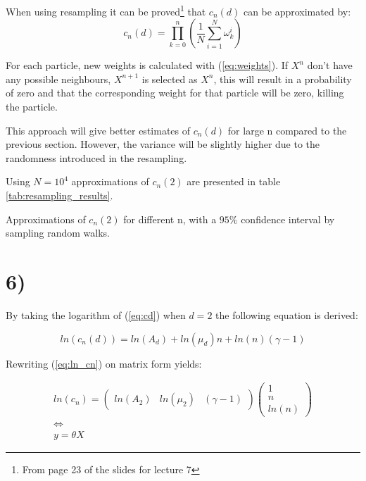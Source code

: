 \documentclass[a4paper]{article}
\begin{document}
When using resampling it can be proved\footnote{From page 23 of the slides for lecture 7} that $c_n(d)$ can be approximated by:
\begin{equation}
    c_n(d) = \prod_{k = 0}^n(\frac{1}{N}\sum_{i=1}^N\omega_k^i)
\end{equation}

For each particle, new weights is calculated with (\ref{eq:weights}). If $X^{n}$ don't have any possible neighbours, $X^{n+1}$ is selected as $X^n$, this will result in a probability of zero and that the corresponding weight for that particle will be zero, killing the particle.

This approach will give better estimates of $c_n(d)$ for large n compared to the previous section. However, the variance will be slightly higher due to the randomness introduced in the resampling.

Using $N = 10^4$ approximations of $c_n(2)$ are presented in table \ref{tab:resampling_results}.

\begin{table}[H]
    \centering
    \caption{Approximations of $c_n(2)$ for different n, with a $95\%$ confidence interval by sampling random walks.}
    \label{tab:resampling_results}
    
\end{table}

\section*{6)}

By taking the logarithm of (\ref{eq:cd}) when $d=2$ the following equation is derived:

\begin{equation}
    ln(c_n(d)) =  ln(A_d)+ln(\mu_d)n+ln(n)({\gamma-1})
    \label{eq:ln_cn}
\end{equation}

Rewriting (\ref{eq:ln_cn}) on matrix form yields:

\begin{equation}
    \begin{gathered}
        ln(c_n)=
        \begin{pmatrix}
            ln(A_2) & ln(\mu_2) & (\gamma -1)
        \end{pmatrix}
        \begin{pmatrix}
            1 \\
            n \\
            ln(n)
        \end{pmatrix}
        \\
        \iff
        \\
        y = \theta X
    \end{gathered}
\end{equation}
\end{document}
